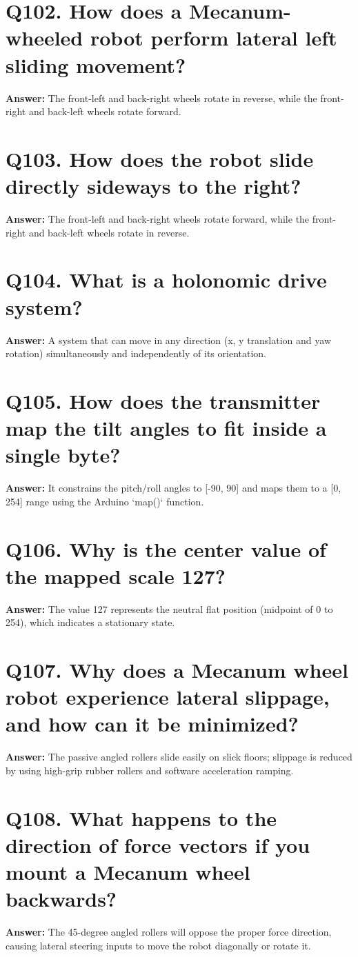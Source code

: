 \documentclass[12pt,a4paper,oneside]{report}
\begin{document}
\section{Q102. How does a Mecanum-wheeled robot perform lateral left sliding movement?}
\textbf{Answer:} The front-left and back-right wheels rotate in reverse, while the front-right and back-left wheels rotate forward.

\section{Q103. How does the robot slide directly sideways to the right?}
\textbf{Answer:} The front-left and back-right wheels rotate forward, while the front-right and back-left wheels rotate in reverse.

\section{Q104. What is a holonomic drive system?}
\textbf{Answer:} A system that can move in any direction (x, y translation and yaw rotation) simultaneously and independently of its orientation.

\section{Q105. How does the transmitter map the tilt angles to fit inside a single byte?}
\textbf{Answer:} It constrains the pitch/roll angles to [-90, 90] and maps them to a [0, 254] range using the Arduino `map()` function.

\section{Q106. Why is the center value of the mapped scale 127?}
\textbf{Answer:} The value 127 represents the neutral flat position (midpoint of 0 to 254), which indicates a stationary state.

\section{Q107. Why does a Mecanum wheel robot experience lateral slippage, and how can it be minimized?}
\textbf{Answer:} The passive angled rollers slide easily on slick floors; slippage is reduced by using high-grip rubber rollers and software acceleration ramping.

\section{Q108. What happens to the direction of force vectors if you mount a Mecanum wheel backwards?}
\textbf{Answer:} The 45-degree angled rollers will oppose the proper force direction, causing lateral steering inputs to move the robot diagonally or rotate it.
\end{document}
